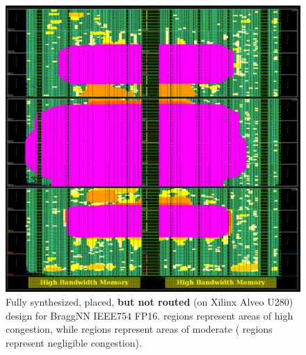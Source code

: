 \begin{figure}
	\includegraphics[width=\columnwidth]{figures/congestion_alveo}
	\caption{Fully synthesized, placed, \textbf{but not routed} (on Xilinx Alveo U280) design for BraggNN IEEE754 FP16. \crule[violet]{0.25cm}{0.25cm} regions represent areas of high congestion, while \crule[orange]{0.25cm}{0.25cm} regions represent areas of moderate (\crule[green]{0.25cm}{0.25cm} regions represent negligible congestion).}\label{fig:congestion_alveo}
\end{figure}

